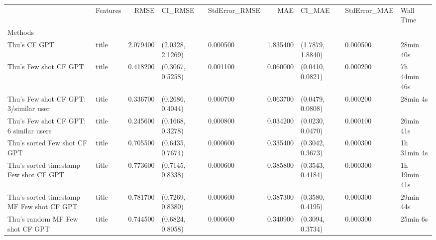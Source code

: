 \begin{tabular}{llrllrlll}
 & Features & RMSE & CI_RMSE & StdError_RMSE & MAE & CI_MAE & StdError_MAE & Wall Time \\
Methods &  &  &  &  &  &  &  &  \\
Thu's CF GPT & title & 2.079400 & (2.0328, 2.1269) & 0.000500 & 1.835400 & (1.7879, 1.8840) & 0.000500 & 28min 40s \\
Thu's Few shot CF GPT & title & 0.418200 & (0.3067, 0.5258) & 0.001100 & 0.060000 & (0.0410, 0.0821) & 0.000200 & 7h 44min 46s \\
Thu's Few shot CF GPT: 3/similar user & title & 0.336700 & (0.2686, 0.4044) & 0.000700 & 0.063700 & (0.0479, 0.0808) & 0.000200 & 28min 4s \\
Thu's Few shot CF GPT: 6 similar users & title & 0.245600 & (0.1668, 0.3278) & 0.000800 & 0.034200 & (0.0230, 0.0470) & 0.000100 & 26min 41s \\
Thu's sorted Few shot CF GPT & title & 0.705500 & (0.6435, 0.7674) & 0.000600 & 0.335400 & (0.3042, 0.3673) & 0.000300 & 1h 31min 4s \\
Thu's sorted timestamp Few shot CF GPT & title & 0.773600 & (0.7145, 0.8338) & 0.000600 & 0.385800 & (0.3543, 0.4184) & 0.000300 & 1h 19min 41s \\
Thu's sorted timestamp MF Few shot CF GPT & title & 0.781700 & (0.7269, 0.8380) & 0.000600 & 0.387300 & (0.3580, 0.4195) & 0.000300 & 29min 44s \\
Thu's random MF Few shot CF GPT & title & 0.744500 & (0.6824, 0.8058) & 0.000600 & 0.340900 & (0.3094, 0.3734) & 0.000300 & 25min 6s \\
\end{tabular}
